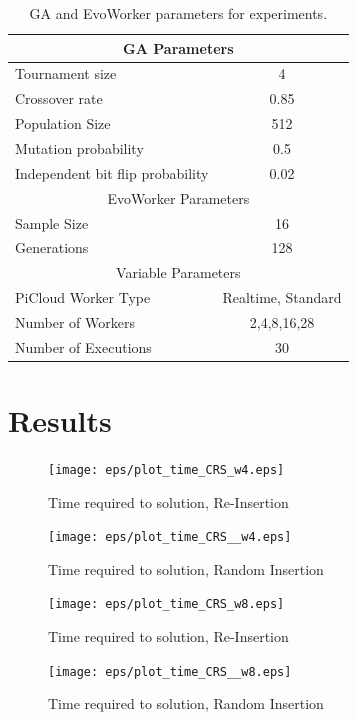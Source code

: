 \documentclass{llncs}
\begin{document}
\begin{table}[!t]
\renewcommand{\arraystretch}{1.3}
\caption{GA and EvoWorker parameters for experiments.}
\label{params}
\centering
\begin{tabular}{|l|c|}
\hline
\multicolumn{2}{|c|}{GA Parameters} \\
\hline
Tournament size & 4 \\
Crossover rate & 0.85  \\
Population Size & 512 \\
Mutation probability & 0.5 \\
Independent bit flip probability  & 0.02 \\
\hline
\multicolumn{2}{|c|}{EvoWorker Parameters} \\
\hline
Sample Size & 16 \\
Generations & 128 \\
\hline
\multicolumn{2}{|c|}{Variable Parameters} \\
\hline
PiCloud Worker Type & Realtime, Standard \\
Number of Workers & 2,4,8,16,28 \\
Number of Executions & 30 \\
\hline

\end{tabular}
\end{table}
\section{Results}

\begin{figure}[!t]
\centering
\texttt{[image: eps/plot\_time\_CRS\_w4.eps]}
\caption{Time required to solution, Re-Insertion}
\label{fig:plot_time_ri_w4}
\end{figure}

\begin{figure}[!t]
\centering
\texttt{[image: eps/plot\_time\_CRS\_\_w4.eps]}
\caption{Time required to solution, Random Insertion}
\label{fig:plot_time_ra_w4}
\end{figure}

\begin{figure}[!t]
\centering
\texttt{[image: eps/plot\_time\_CRS\_w8.eps]}
\caption{Time required to solution, Re-Insertion}
\label{fig:plot_time_ri_w8}
\end{figure}

\begin{figure}[!t]
\centering
\texttt{[image: eps/plot\_time\_CRS\_\_w8.eps]}
\caption{Time required to solution, Random Insertion}
\label{fig:plot_time_ra_w8}
\end{figure}
\end{document}
